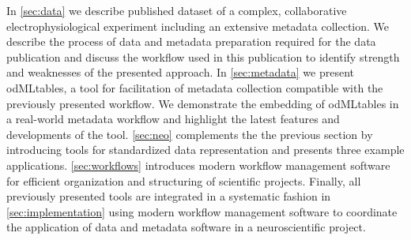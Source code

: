 In \cref{sec:data} we describe published dataset of a complex, collaborative electrophysiological experiment including an extensive metadata collection. We describe the process of data and metadata preparation required for the data publication and discuss the workflow used in this publication to identify strength and weaknesses of the presented approach. In \cref{sec:metadata} we present odMLtables, a tool for facilitation of metadata collection compatible with the previously presented workflow. We demonstrate the embedding of odMLtables in a real-world metadata workflow and highlight the latest features and developments of the tool. \cref{sec:neo} complements the the previous section by introducing tools for standardized data representation and presents three example applications. \cref{sec:workflows} introduces modern workflow management software for efficient organization and structuring of scientific projects. Finally, all previously presented tools are integrated in a systematic fashion in \cref{sec:implementation} using modern workflow management software to coordinate the application of data and metadata software in a neuroscientific project.
